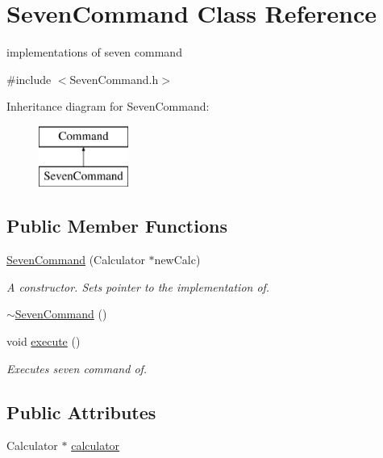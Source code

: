 \hypertarget{class_seven_command}{}\section{Seven\+Command Class Reference}
\label{class_seven_command}


implementations of seven command  




{\ttfamily \#include $<$Seven\+Command.\+h$>$}

Inheritance diagram for Seven\+Command\+:\begin{figure}[H]
\begin{center}
\leavevmode
\includegraphics[height=2.000000cm]{class_seven_command}
\end{center}
\end{figure}
\subsection*{Public Member Functions}
\begin{DoxyCompactItemize}
\item 
\hyperlink{class_seven_command_a0b3849d60dc9d685e42bc9791a28a1cd}{Seven\+Command} (Calculator $\ast$new\+Calc)
\begin{DoxyCompactList}\small\item\em A constructor. Sets pointer to the implementation of. \end{DoxyCompactList}\item 
\hyperlink{class_seven_command_a82fef442b3ae5661db3eb99e6a7dbd3a}{$\sim$\+Seven\+Command} ()
\item 
void \hyperlink{class_seven_command_a89ebb0bc60979b8b6d5dc65cc195f38f}{execute} ()
\begin{DoxyCompactList}\small\item\em Executes seven command of. \end{DoxyCompactList}\end{DoxyCompactItemize}
\subsection*{Public Attributes}
\begin{DoxyCompactItemize}
\item 
Calculator $\ast$ \hyperlink{class_seven_command_a5758d5e5b5981f81bd56c54c87f25b48}{calculator}
\end{DoxyCompactItemize}


